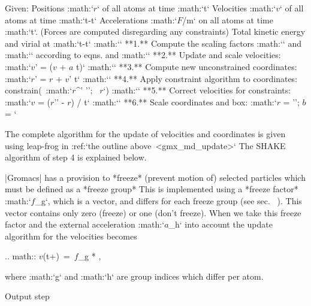  
 Given:
 Positions :math:`{\mbox{\boldmath ${r}$}}` of all atoms at time
 :math:`t`
 Velocities :math:`{\mbox{\boldmath ${v}$}}` of all atoms at time
 :math:`t-{{}{{\Delta t}}}`
 Accelerations :math:`{\mbox{\boldmath ${F}$}}/m` on all atoms at time
 :math:`t`.
 (Forces are computed disregarding any constraints)
 Total kinetic energy and virial at :math:`t-{{\Delta t}}`
 :math:`\Downarrow`
 **1.** Compute the scaling factors :math:`\lambda` and :math:`\mu`
 according to eqns.
 and
 :math:`\Downarrow`
 **2.** Update and scale velocities:
 :math:`{\mbox{\boldmath ${v}$}}' =  \lambda ({\mbox{\boldmath ${v}$}} +
 {\mbox{\boldmath ${a}$}} \Delta t)`
 :math:`\Downarrow`
 **3.** Compute new unconstrained coordinates:
 :math:`{\mbox{\boldmath ${r}$}}' = {\mbox{\boldmath ${r}$}} + {\mbox{\boldmath ${v}$}}'
 \Delta t`
 :math:`\Downarrow`
 **4.** Apply constraint algorithm to coordinates:
 constrain(\ :math:`{\mbox{\boldmath ${r}$}}^{'} '';
 \,  {\mbox{\boldmath ${r}$}}`)
 :math:`\Downarrow`
 **5.** Correct velocities for constraints:
 :math:`{\mbox{\boldmath ${v}$}} = ({\mbox{\boldmath ${r}$}}'' -
 {\mbox{\boldmath ${r}$}}) / \Delta t`
 :math:`\Downarrow`
 **6.** Scale coordinates and box:
 :math:`{\mbox{\boldmath ${r}$}} = ''; {\mbox{\boldmath ${b}$}} =
 `

The complete algorithm for the update of velocities and coordinates is
given using leap-frog in :ref:`the outline above <gmx_md_update>`
The SHAKE algorithm of step 4 is explained below.

|Gromacs| has a provision to *freeze* (prevent motion of) selected
particles
which must be defined as a
*freeze group*
This is implemented using a *freeze factor*
:math:`{\mbox{\boldmath ${f}$}}_g`, which is a vector, and differs for
each freeze group (see sec. 
). This
vector contains only zero (freeze) or one (don’t freeze). When we take
this freeze factor and the external acceleration
:math:`{\mbox{\boldmath ${a}$}}_h` into account the update algorithm for
the velocities becomes

.. math:: {\mbox{\boldmath ${v}$}}(t+{})~=~{\mbox{\boldmath ${f}$}}_g * \lambda * ,

where :math:`g` and :math:`h` are group indices which differ per atom.

Output step
~~~~~~~~~~~

